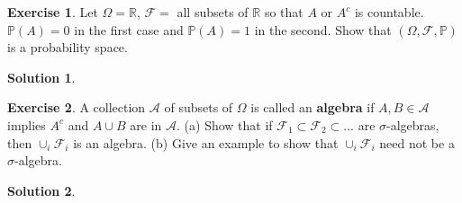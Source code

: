 \documentclass[12pt]{article}
\newcommand{\Prob}{\mathbb{P}}
\theoremstyle{definition}
\newtheorem{exer}{Exercise}
\newtheorem{sol}{Solution}
\theoremstyle{remark}
\begin{document}
\newpage
\begin{exer}
Let $\Omega=\mathbb{R}$, $\mathcal{F}=$ all subsets of $\mathbb{R}$ so that $A$ or $A^c$ is countable. $\Prob(A)=0$ in the first case and $\Prob(A)=1$ in the second. Show that $(\Omega, \mathcal{F}, \Prob)$ is a probability space.
\end{exer}
\begin{sol}

\end{sol}

\newpage
\begin{exer}
A collection $\mathcal{A}$ of subsets of $\Omega$ is called an {\bf algebra} if $A,B \in \mathcal{A}$ implies $A^c$ and $A\cup B$ are in  $\mathcal{A}$. (a) Show that if $\mathcal{F}_1 \subset \mathcal{F}_2 \subset ...$ are $\sigma$-algebras, then $\cup_i \mathcal{F}_i$ is an algebra. (b) Give an example to show that $\cup_i \mathcal{F}_i$ need not be a $\sigma$-algebra.
\end{exer}
\begin{sol}

\end{sol}
\end{document}
